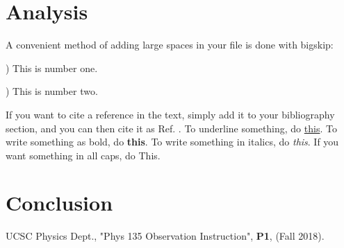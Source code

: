 \documentclass[]{article}
\begin{document}
\section*{Analysis}


A convenient method of adding large spaces in your file is 
done with bigskip:

) This is number one.

) This is number two.
\bigskip

If you want to cite a reference in the text, simply add it to 
your bibliography section, and you can then cite it as Ref. .
To underline something, do \underline{this}. To write something as bold, 
do \textbf{this}. To write something in italics, do \textit{this}. If you 
want something in all caps, do {\sc This}.

\section*{Conclusion}

\begin{thebibliography}{4}

 UCSC Physics Dept.,  "Phys 135 Observation Instruction", {\bf P1}, (Fall 2018).

\end{thebibliography}
\end{document}
